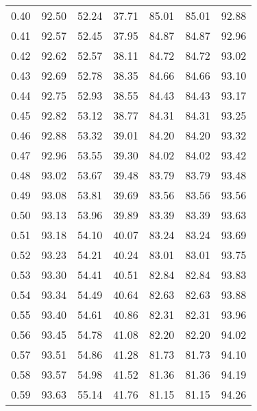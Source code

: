 \begin{tabular}{|c|c|c|c|c|c|c|}
      0.40 &     92.50 &     52.24 &      37.71 &   85.01 &      85.01 &         92.88 \\
      0.41 &     92.57 &     52.45 &      37.95 &   84.87 &      84.87 &         92.96 \\
      0.42 &     92.62 &     52.57 &      38.11 &   84.72 &      84.72 &         93.02 \\
      0.43 &     92.69 &     52.78 &      38.35 &   84.66 &      84.66 &         93.10 \\
      0.44 &     92.75 &     52.93 &      38.55 &   84.43 &      84.43 &         93.17 \\
      0.45 &     92.82 &     53.12 &      38.77 &   84.31 &      84.31 &         93.25 \\
      0.46 &     92.88 &     53.32 &      39.01 &   84.20 &      84.20 &         93.32 \\
      0.47 &     92.96 &     53.55 &      39.30 &   84.02 &      84.02 &         93.42 \\
      0.48 &     93.02 &     53.67 &      39.48 &   83.79 &      83.79 &         93.48 \\
      0.49 &     93.08 &     53.81 &      39.69 &   83.56 &      83.56 &         93.56 \\
      0.50 &     93.13 &     53.96 &      39.89 &   83.39 &      83.39 &         93.63 \\
      0.51 &     93.18 &     54.10 &      40.07 &   83.24 &      83.24 &         93.69 \\
      0.52 &     93.23 &     54.21 &      40.24 &   83.01 &      83.01 &         93.75 \\
      0.53 &     93.30 &     54.41 &      40.51 &   82.84 &      82.84 &         93.83 \\
      0.54 &     93.34 &     54.49 &      40.64 &   82.63 &      82.63 &         93.88 \\
      0.55 &     93.40 &     54.61 &      40.86 &   82.31 &      82.31 &         93.96 \\
      0.56 &     93.45 &     54.78 &      41.08 &   82.20 &      82.20 &         94.02 \\
      0.57 &     93.51 &     54.86 &      41.28 &   81.73 &      81.73 &         94.10 \\
      0.58 &     93.57 &     54.98 &      41.52 &   81.36 &      81.36 &         94.19 \\
      0.59 &     93.63 &     55.14 &      41.76 &   81.15 &      81.15 &         94.26 \\

\end{tabular}
